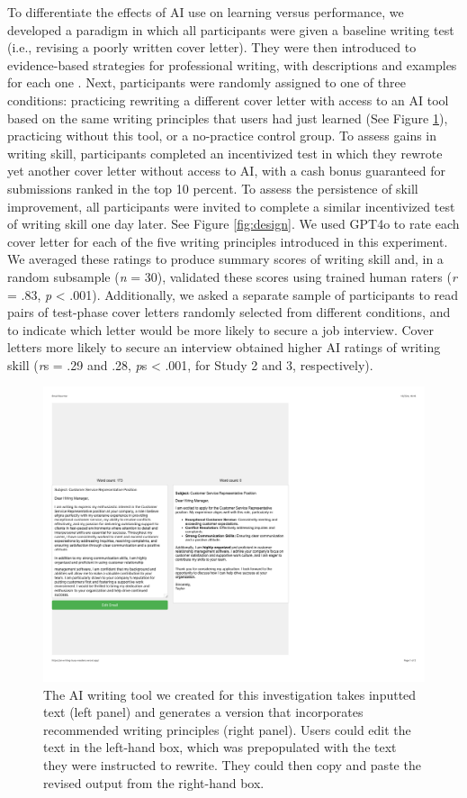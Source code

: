 \documentclass[11pt]{report}
\begin{document}
\begin{mainf}
  To differentiate the effects of AI use on learning versus performance, we developed a paradigm in which all participants were given a baseline writing test (i.e., revising a poorly written cover letter).
  They were then introduced to evidence-based strategies for professional writing, with descriptions and examples for each one \cite{rogers2023,shulman2024}. 
  Next, participants were randomly assigned to one of three conditions: practicing rewriting a different cover letter with access to an AI tool based on the same writing principles that users had just learned (See Figure \ref{fig:tool}), practicing without this tool, or a no-practice control group. 
  To assess gains in writing skill, participants completed an incentivized test in which they rewrote yet another cover letter without access to AI, with a cash bonus guaranteed for submissions ranked in the top 10 percent. 
  To assess the persistence of skill improvement, all participants were invited to complete a similar incentivized test of writing skill one day later.
  See Figure \ref{fig:design}.
  We used GPT4o to rate each cover letter for each of the five writing principles introduced in this experiment. We averaged these ratings to produce summary scores of writing skill and, in a random subsample (\textit{n} = 30), validated these scores using trained human raters (\textit{r} = .83, \textit{p} < .001).
  Additionally, we asked a separate sample of participants to read pairs of test-phase cover letters randomly selected from different conditions, and to indicate which letter would be more likely to secure a job interview. 
  Cover letters more likely to secure an interview obtained higher AI ratings of writing skill (\textit{r}s = .29 and .28, \textit{p}s < .001, for Study 2 and 3, respectively). 

\begin{figure}[t]
    \centering
    \includegraphics[width=.9\linewidth]{EmailRewriter.pdf}
    \caption{The AI writing tool we created for this investigation takes inputted text (left panel) and generates a version that incorporates recommended writing principles (right panel). Users could edit the text in the left-hand box, which was prepopulated with the text they were instructed to rewrite. They could then copy and paste the revised output from the right-hand box.}
    \label{fig:tool}
\end{figure}


\end{mainf}
\end{document}
